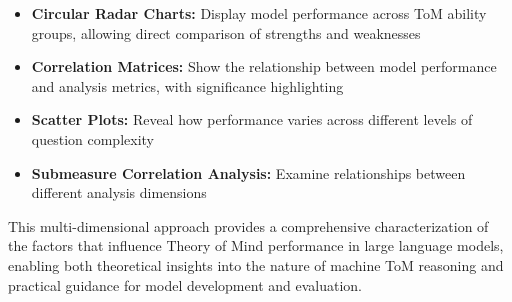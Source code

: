 \documentclass[12pt]{article}
\begin{document}
\begin{itemize}
    \item \textbf{Circular Radar Charts:} Display model performance across ToM ability groups, allowing direct comparison of strengths and weaknesses
    \item \textbf{Correlation Matrices:} Show the relationship between model performance and analysis metrics, with significance highlighting
    \item \textbf{Scatter Plots:} Reveal how performance varies across different levels of question complexity
    \item \textbf{Submeasure Correlation Analysis:} Examine relationships between different analysis dimensions
\end{itemize}

This multi-dimensional approach provides a comprehensive characterization of the factors that influence Theory of Mind performance in large language models, enabling both theoretical insights into the nature of machine ToM reasoning and practical guidance for model development and evaluation.
\end{document}

